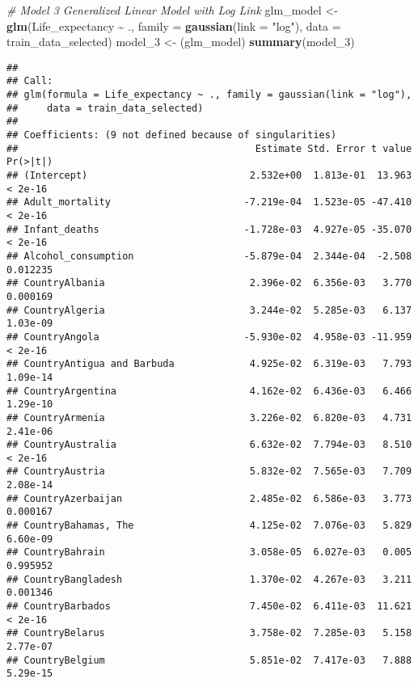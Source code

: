 \documentclass[
]{article}
\newenvironment{Shaded}{\begin{snugshade}}{\end{snugshade}}
\newcommand{\AttributeTok}[1]{\textcolor[rgb]{0.13,0.29,0.53}{#1}}
\newcommand{\CommentTok}[1]{\textcolor[rgb]{0.56,0.35,0.01}{\textit{#1}}}
\newcommand{\FunctionTok}[1]{\textcolor[rgb]{0.13,0.29,0.53}{\textbf{#1}}}
\newcommand{\NormalTok}[1]{#1}
\newcommand{\OtherTok}[1]{\textcolor[rgb]{0.56,0.35,0.01}{#1}}
\newcommand{\SpecialCharTok}[1]{\textcolor[rgb]{0.81,0.36,0.00}{\textbf{#1}}}
\newcommand{\StringTok}[1]{\textcolor[rgb]{0.31,0.60,0.02}{#1}}
\begin{document}
\begin{Shaded}
\begin{Highlighting}[]
\CommentTok{\# Model 3 Generalized Linear Model with Log Link}
\NormalTok{glm\_model }\OtherTok{\textless{}{-}} \FunctionTok{glm}\NormalTok{(Life\_expectancy }\SpecialCharTok{\textasciitilde{}}\NormalTok{ ., }\AttributeTok{family =} \FunctionTok{gaussian}\NormalTok{(}\AttributeTok{link =} \StringTok{"log"}\NormalTok{), }\AttributeTok{data =}\NormalTok{ train\_data\_selected)}
\NormalTok{model\_3 }\OtherTok{\textless{}{-}}\NormalTok{ (glm\_model)}
\FunctionTok{summary}\NormalTok{(model\_3)}
\end{Highlighting}
\end{Shaded}

\begin{verbatim}
## 
## Call:
## glm(formula = Life_expectancy ~ ., family = gaussian(link = "log"), 
##     data = train_data_selected)
## 
## Coefficients: (9 not defined because of singularities)
##                                         Estimate Std. Error t value Pr(>|t|)
## (Intercept)                            2.532e+00  1.813e-01  13.963  < 2e-16
## Adult_mortality                       -7.219e-04  1.523e-05 -47.410  < 2e-16
## Infant_deaths                         -1.728e-03  4.927e-05 -35.070  < 2e-16
## Alcohol_consumption                   -5.879e-04  2.344e-04  -2.508 0.012235
## CountryAlbania                         2.396e-02  6.356e-03   3.770 0.000169
## CountryAlgeria                         3.244e-02  5.285e-03   6.137 1.03e-09
## CountryAngola                         -5.930e-02  4.958e-03 -11.959  < 2e-16
## CountryAntigua and Barbuda             4.925e-02  6.319e-03   7.793 1.09e-14
## CountryArgentina                       4.162e-02  6.436e-03   6.466 1.29e-10
## CountryArmenia                         3.226e-02  6.820e-03   4.731 2.41e-06
## CountryAustralia                       6.632e-02  7.794e-03   8.510  < 2e-16
## CountryAustria                         5.832e-02  7.565e-03   7.709 2.08e-14
## CountryAzerbaijan                      2.485e-02  6.586e-03   3.773 0.000167
## CountryBahamas, The                    4.125e-02  7.076e-03   5.829 6.60e-09
## CountryBahrain                         3.058e-05  6.027e-03   0.005 0.995952
## CountryBangladesh                      1.370e-02  4.267e-03   3.211 0.001346
## CountryBarbados                        7.450e-02  6.411e-03  11.621  < 2e-16
## CountryBelarus                         3.758e-02  7.285e-03   5.158 2.77e-07
## CountryBelgium                         5.851e-02  7.417e-03   7.888 5.29e-15

\end{verbatim}
\end{document}
